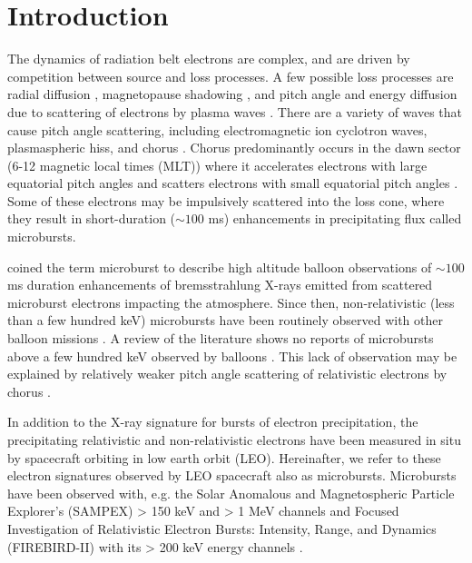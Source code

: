 \documentclass[draft, linenumbers]{agujournal}
\begin{document}
\section{Introduction}\label{Intro}
The dynamics of radiation belt electrons are complex, and are driven by competition between source and loss processes. A few possible loss processes are radial diffusion \citep{Shprits2004}, magnetopause shadowing \citep{Ukhorskiy2006}, and pitch angle and energy diffusion due to scattering of electrons by plasma waves \citep[e.g.][]{Abel1998_1, Summers1998, Meredith2002, Selesnick2003, Horne2003, Thorne2005, Mozer2018}. There are a variety of waves that cause pitch angle scattering, including electromagnetic ion cyclotron waves, plasmaspheric hiss, and chorus \citep{Millan2007, Thorne2010}. Chorus predominantly occurs in the dawn sector (6-12 magnetic local times (MLT)) \citep{Li2009} where it accelerates electrons with large equatorial pitch angles and scatters electrons with small equatorial pitch angles \citep{Horne2003}. Some of these electrons may be impulsively scattered into the loss cone, where they result in short-duration ($\sim 100$ ms) enhancements in precipitating flux called microbursts.

\citet{Anderson1964} coined the term microburst to describe high altitude balloon observations of $\sim 100$ ms duration enhancements of bremsstrahlung X-rays emitted from scattered microburst electrons impacting the atmosphere. Since then, non-relativistic (less than a few hundred keV) microbursts have been routinely observed with other balloon missions \citep[e.g.][]{Parks1967, Woodger2015, Anderson2017}. A review of the literature shows no reports of microbursts above a few hundred keV observed by balloons \citep{Millan2002, Woodger2015}. This lack of observation may be explained by relatively weaker pitch angle scattering of relativistic electrons by chorus \citep{Lee2012}. 

In addition to the X-ray signature  for bursts of electron precipitation, the precipitating relativistic and non-relativistic electrons have been measured in situ by spacecraft orbiting in low earth orbit (LEO). Hereinafter, we refer to these electron signatures observed by LEO spacecraft also as microbursts. Microbursts have been observed with, e.g. the Solar Anomalous and Magnetospheric Particle Explorer's (SAMPEX) > 150 keV and > 1 MeV channels \citep{Nakamura1995, Nakamura2000, Blake1996, Lorentzen2001a, Lorentzen2001b, O'Brien2003, O'Brien2004, Blum2015} and Focused Investigation of Relativistic Electron Bursts: Intensity, Range, and Dynamics (FIREBIRD-II) with its > 200 keV energy channels \citep{Crew2016, Anderson2017, Breneman2017}. 
\end{document}
